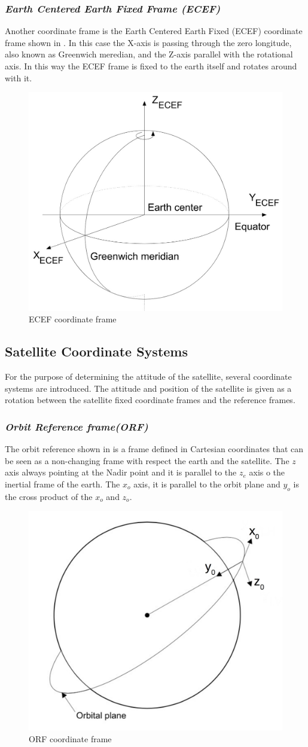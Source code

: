 \subsubsection{\textit{Earth Centered Earth Fixed Frame (ECEF)}}
Another coordinate frame is the Earth Centered Earth Fixed (ECEF) coordinate frame shown in . In this case the X-axis is passing through the zero longitude, also known as Greenwich meredian, and the Z-axis parallel with the rotational axis. In this way the ECEF frame is fixed to the earth itself and rotates around with it.
\begin{figure}[H]
\centering
\includegraphics[width=0.5\linewidth]{figures/ECEF}
\caption{ECEF coordinate frame}
\label{fig:ECEF}
\end{figure}
\subsection{Satellite Coordinate Systems}
For the purpose of determining the attitude of the satellite, several coordinate systems are introduced. The attitude and position of the satellite is given as a rotation between the satellite fixed coordinate frames and the reference frames.
\subsubsection{\textit{Orbit Reference frame(ORF)}}
The orbit reference shown in  is a frame defined in Cartesian coordinates that can be seen as a non-changing frame with respect the earth and the satellite. The $z$ axis always pointing at the Nadir point and it is parallel to the $z_{e}$ axis o the inertial frame of the earth. The $x_{o}$ axis, it is parallel to the orbit plane and $y_{o}$ is the cross product of the $x_{o}$ and $z_{o}$. 
\begin{figure}[H]
	\centering
	\includegraphics[width=0.4\linewidth]{figures/OFR}
	\caption{ORF coordinate frame}
	\label{fig:OFR}
\end{figure}
